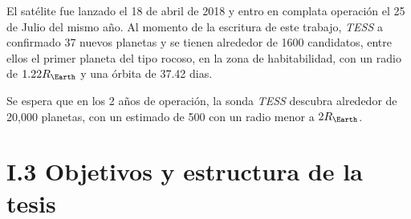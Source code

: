 El satélite fue lanzado el 18 de abril de 2018 y entro en complata operación el 25 de Julio del mismo año. Al momento de la escritura de este trabajo, \textit{TESS} a confirmado 37 nuevos planetas y se tienen alrededor de 1600 candidatos, entre ellos el primer planeta del tipo rocoso, en la zona de habitabilidad, con un radio de $1.22R_{\Earth}$ y una órbita de 37.42 dias. \cite{gilbert2020first}

Se espera que en los 2 años de operación, la sonda \textit{TESS} descubra alrededor de 20,000 planetas, con un estimado de 500 con un radio menor a $2R_{\Earth}$.

\section*{I.3 Objetivos y estructura de la tesis}













